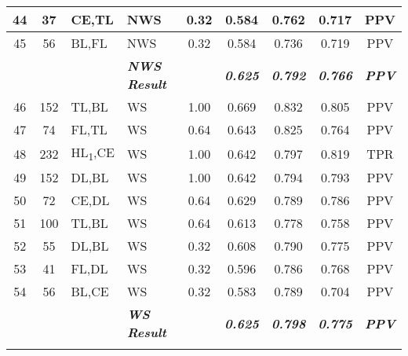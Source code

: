 \begin{table}[H]
{\begin{tabular}{ccl|l|c|c|c|c|c|}
  \multicolumn{1}{|c|}{44} &
    \multicolumn{1}{c|}{37} &
    CE,TL &
    NWS &
    0.32 &
    0.584 &
    0.762 &
    0.717 &
    PPV \\ \hline
  \multicolumn{1}{|c|}{45} &
    \multicolumn{1}{c|}{56} &
    BL,FL &
    NWS &
    0.32 &
    0.584 &
    0.736 &
    0.719 &
    PPV \\ \hline
   &
    \textit{\textbf{}} &
     &
    \textit{\textbf{NWS Result}} &
     &
    \textit{\textbf{0.625}} &
    \textit{\textbf{0.792}} &
    \textit{\textbf{0.766}} &
    \textit{\textbf{PPV}} \\ \hline
  \multicolumn{1}{|c|}{46} &
    \multicolumn{1}{c|}{152} &
    TL,BL &
    WS &
    1.00 &
    0.669 &
    0.832 &
    0.805 &
    PPV \\ \hline
  \multicolumn{1}{|c|}{47} &
    \multicolumn{1}{c|}{74} &
    FL,TL &
    WS &
    0.64 &
    0.643 &
    0.825 &
    0.764 &
    PPV \\ \hline
  \multicolumn{1}{|c|}{48} &
    \multicolumn{1}{c|}{232} &
    HL\textsubscript{1},CE &
    WS &
    1.00 &
    0.642 &
    0.797 &
    0.819 &
    TPR \\ \hline
  \multicolumn{1}{|c|}{49} &
    \multicolumn{1}{c|}{152} &
    DL,BL &
    WS &
    1.00 &
    0.642 &
    0.794 &
    0.793 &
    PPV \\ \hline
  \multicolumn{1}{|c|}{50} &
    \multicolumn{1}{c|}{72} &
    CE,DL &
    WS &
    0.64 &
    0.629 &
    0.789 &
    0.786 &
    PPV \\ \hline
  \multicolumn{1}{|c|}{51} &
    \multicolumn{1}{c|}{100} &
    TL,BL &
    WS &
    0.64 &
    0.613 &
    0.778 &
    0.758 &
    PPV \\ \hline
  \multicolumn{1}{|c|}{52} &
    \multicolumn{1}{c|}{55} &
    DL,BL &
    WS &
    0.32 &
    0.608 &
    0.790 &
    0.775 &
    PPV \\ \hline
  \multicolumn{1}{|c|}{53} &
    \multicolumn{1}{c|}{41} &
    FL,DL &
    WS &
    0.32 &
    0.596 &
    0.786 &
    0.768 &
    PPV \\ \hline
  \multicolumn{1}{|c|}{54} &
    \multicolumn{1}{c|}{56} &
    BL,CE &
    WS &
    0.32 &
    0.583 &
    0.789 &
    0.704 &
    PPV \\ \hline
   &
    \textit{\textbf{}} &
     &
    \textit{\textbf{WS Result}} &
     &
    \textit{\textbf{0.625}} &
    \textit{\textbf{0.798}} &
    \textit{\textbf{0.775}} &
    \textit{\textbf{PPV}} \\ \cline{4-4} \cline{6-9} 
   &
    \textit{\textbf{}} &
     &

\end{tabular}}
\end{table}
